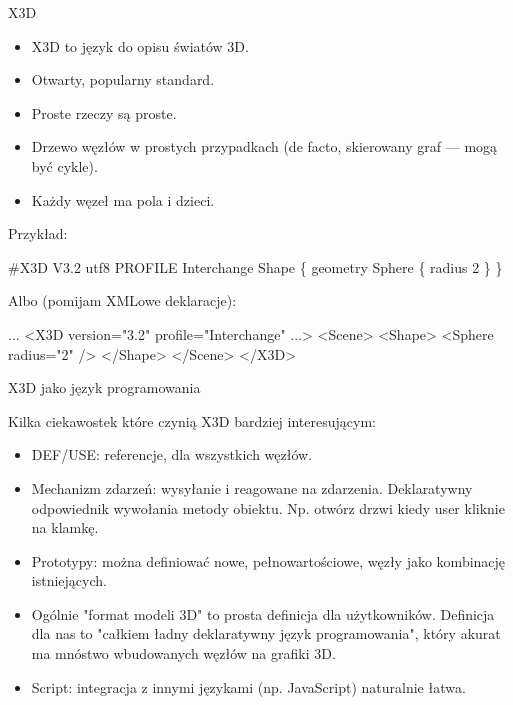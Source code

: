 \documentclass{beamer}
\begin{document}
\begin{frame}{X3D}

\begin{itemize}
  \item X3D to język do opisu światów 3D.
  \item Otwarty, popularny standard.
  \item Proste rzeczy są proste.
  \item Drzewo węzłów w prostych przypadkach (de facto, skierowany graf
    --- mogą być cykle).
  \item Każdy węzeł ma pola i dzieci.
\end{itemize}

Przykład:

\begin{semiverbatim}
\#X3D V3.2 utf8
PROFILE Interchange
Shape \{
  geometry Sphere \{ radius 2 \}
\}
\end{semiverbatim}

Albo (pomijam XMLowe deklaracje):

\begin{semiverbatim}
...
<X3D version="3.2" profile="Interchange" ...>
  <Scene>
    <Shape>
      <Sphere radius="2" />
    </Shape>
  </Scene>
</X3D>
\end{semiverbatim}

\end{frame}

\begin{frame}{X3D jako język programowania}

Kilka ciekawostek które czynią X3D bardziej interesującym:

\begin{itemize}
  \item DEF/USE: referencje, dla wszystkich węzłów.
  \item Mechanizm zdarzeń: wysyłanie i reagowane na zdarzenia.
    Deklaratywny odpowiednik wywołania metody obiektu.
    Np. otwórz drzwi kiedy user kliknie na klamkę.
  \item Prototypy: można definiować nowe, pełnowartościowe,
    węzły jako kombinację istniejących.
  \item Ogólnie "format modeli 3D" to prosta definicja dla użytkowników.
    Definicja dla nas to "całkiem ładny deklaratywny język programowania",
    który akurat ma mnóstwo wbudowanych węzłów na grafiki 3D.
  \item Script: integracja z innymi językami (np. JavaScript) naturalnie łatwa.
\end{itemize}
\end{frame}
\end{document}
